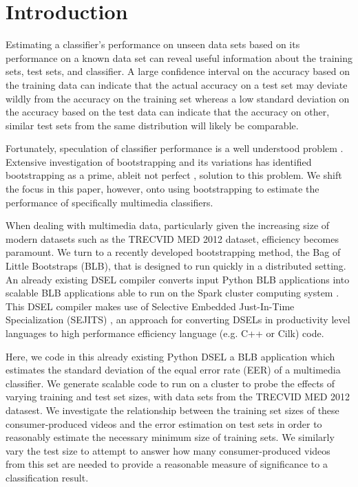 \section{Introduction}

Estimating a classifier's performance on unseen data sets based on its performance on a known data set can reveal useful information about the training sets, test sets, and classifier. A large confidence interval on the accuracy based on the training data can indicate that the actual accuracy on a test set may deviate wildly from the accuracy on the training set whereas a low standard deviation on the accuracy based on the test data can indicate that the accuracy on other, similar test sets from the same distribution will likely be comparable. 

Fortunately, speculation of classifier performance is a well understood problem \cite{fukunaga1989estimation}. 
Extensive investigation of bootstrapping and its variations \cite{efron1979bootstrap,jain1987bootstrap, chernick1985application, sahiner2008classifier} has identified bootstrapping as a prime, ableit not perfect \cite{isaksson2008cross},
solution to this problem. We shift the focus in this paper, however, onto using bootstrapping to estimate the performance of specifically multimedia classifiers. 

When dealing with multimedia data, particularly given the increasing size of modern datasets such as the TRECVID MED 2012 dataset, efficiency becomes paramount. 
We turn to a recently developed bootstrapping method, the Bag of Little Bootstraps (BLB)\cite{kleiner2012big,kleiner2011scalable}, that is designed to run quickly in a distributed setting.
An already existing DSEL compiler converts input Python BLB applications into scalable BLB applications able to run on the Spark cluster computing system \cite{pbirsinger2013}. 
This DSEL compiler makes use of Selective Embedded Just-In-Time Specialization (SEJITS) \cite{Kamil:EECS-2013-1}, an approach for converting DSELs in productivity level languages to high performance efficiency language (e.g. C++ or Cilk) code. 

Here, we code in this already existing Python DSEL a BLB application which estimates the standard deviation of the equal error rate (EER) of a multimedia classifier. We generate scalable code to run on a cluster to probe the effects of varying training and test set sizes, with data sets from the TRECVID MED 2012 datasest. We investigate the relationship between the training set sizes of these consumer-produced videos and the error estimation on test sets in order to reasonably estimate the necessary minimum size of training sets. We similarly vary the test size to attempt to answer how many consumer-produced videos from this set are needed to provide a reasonable measure of significance to a classification result. 

